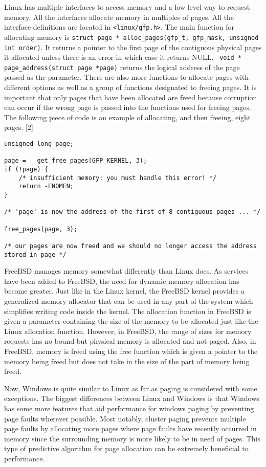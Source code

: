 \documentclass[letterpaper,10pt,draftclsnofoot,onecolumn,]{IEEEtran}
\begin{document}
Linux has multiple interfaces to access memory and a low level way to request memory. All the interfaces allocate memory in multiples of pages. All the interface definitions are located in \verb|<linux/gfp.h>|. The main function for allocating memory is \verb|struct page * alloc_pages(gfp_t, gfp_mask, unsigned int order)|. It returns a pointer to the first page of the contiguous physical pages it allocated unless there is an error in which case it returns NULL. \verb| void * page_address(struct page *page)| returns the logical address of the page passed as the parameter. There are also more functions to allocate pages with different options as well as a group of functions designated to freeing pages. It is important that only pages that have been allocated are freed because corruption can occur if the wrong page is passed into the functions used for freeing pages. The following piece of code is an example of allocating, and then freeing, eight pages. [2]
\begin{lstlisting}
unsigned long page;

page = __get_free_pages(GFP_KERNEL, 3);
if (!page) {
	/* insufficient memory: you must handle this error! */
    return -ENOMEN;
}

/* 'page' is now the address of the first of 8 contiguous pages ... */

free_pages(page, 3);

/* our pages are now freed and we should no longer access the address stored in page */
\end{lstlisting}

FreeBSD manages memory somewhat differently than Linux does. As services have been added to FreeBSD, the need for dynamic memory allocation has become greater. Just like in the Linux kernel, the FreeBSD kernel provides a generalized memory allocator that can be used in any part of the system which simplifies writing code inside the kernel. The allocation function in FreeBSD is given a parameter containing the size of the memory to be allocated just like the Linux allocation function. However, in FreeBSD, the range of sizes for memory requests has no bound but physical memory is allocated and not paged. Also, in FreeBSD, memory is freed using the free function which is given a pointer to the memory being freed but does not take in the size of the part of memory being freed.

Now, Windows is quite similar to Linux as far as paging is considered with some exceptions. The biggest differences between Linux and Windows is that Windows has some more features that aid performance for windows paging by preventing page faults wherever possible. Most notably, cluster paging prevents multiple page faults by allocating more pages where page faults have recently occurred in memory since the surrounding memory is more likely to be in need of pages. This type of predictive algorithm for page allocation can be extremely beneficial to performance.
\end{document}
